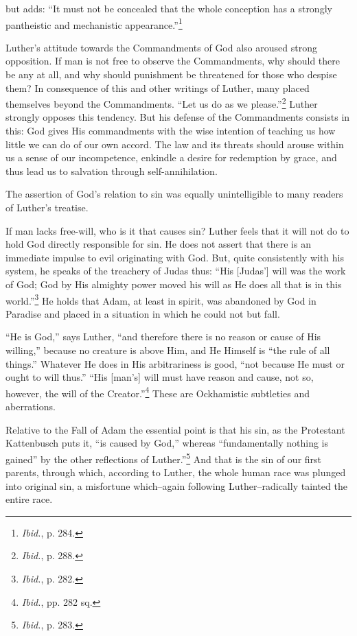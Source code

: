 but adds: “It must
not be concealed that the whole conception has a strongly pantheistic
and mechanistic appearance.”\footnote{\textit{Ibid.}, p. 284.}

Luther’s attitude towards the Commandments of God also aroused
strong opposition. If man is not free to observe the Commandments,
why should there be any at all, and why should punishment be
threatened for those who despise them? In consequence of this and
other writings of Luther, many placed themselves beyond the Commandments.
“Let us do as we please.”\footnote{\textit{Ibid.}, p. 288.}
Luther strongly opposes
this tendency. But his defense of the Commandments consists in
this: God gives His commandments with the wise intention of teaching us
how little we can do of our own accord. The law and its
threats should arouse within us a sense of our incompetence, enkindle
a desire for redemption by grace, and thus lead us to salvation through self-annihilation.

The assertion of God’s relation to sin was equally unintelligible
to many readers of Luther’s treatise.

If man lacks free-will, who is it that causes sin? Luther feels that it will
not do to hold God directly responsible for sin. He does not assert that there
is an immediate impulse to evil originating with God. But, quite consistently
with his system, he speaks of the treachery of Judas thus: “His [Judas’]
will was the work of God; God by His almighty power moved his will as He
does all that is in this world.”\footnote{\textit{Ibid.}, p. 282.}
He holds that Adam, at least in spirit, was
abandoned by God in Paradise and placed in a situation in which he could
not but fall.

“He is God,” says Luther, “and therefore there is no reason or cause of
His willing,” because no creature is above Him, and He Himself is “the
rule of all things.” Whatever He does in His arbitrariness is good, “not
because He must or ought to will thus.” “His [man’s] will must have reason
and cause, not so, however, the will of the Creator.”\footnote{\textit{Ibid.}, pp. 282 sq.}
These are Ockhamistic
subtleties and aberrations.

Relative to the Fall of Adam the essential point is that his sin, as the
Protestant Kattenbusch puts it, “is caused by God,” whereas “fundamentally
nothing is gained” by the other reflections of Luther.”\footnote{\textit{Ibid.}, p. 283.}
And that is the
sin of our first parents, through which, according to Luther, the whole
human race was plunged into original sin, a misfortune which--again following
Luther--radically tainted the entire race.

